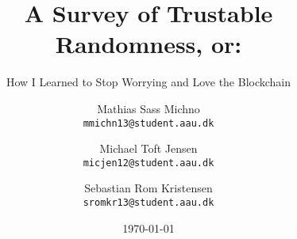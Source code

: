 \newcommand{\TITLE}{A Survey of Trustable Randomness, or:}
\newcommand{\SUBTITLE}{How I Learned to Stop Worrying and Love the Blockchain}
\newcommand{\SUBJECT}{Subject subject}
\newcommand{\THEME}{Theme theme}
\newcommand{\GROUP}{deis923e17}
\newcommand{\PERIOD}{Fall semester, 2017}
\newcommand{\MEMBERS}{%
	Name1\\
	Name2\\
	Name3
}
\newcommand{\SUPERVISOR}{Stefan Schmid}
\newcommand{\COMPLETION}{January 12, 2017}

\title{\TITLE}
\subtitle{\SUBTITLE}
\author{
    Mathias Sass Michno\\
    \texttt{mmichn13@student.aau.dk}
    \and
    Michael Toft Jensen\\
    \texttt{micjen12@student.aau.dk}
    \and
    Sebastian Rom Kristensen\\
    \texttt{sromkr13@student.aau.dk}
}
\date{\today}

